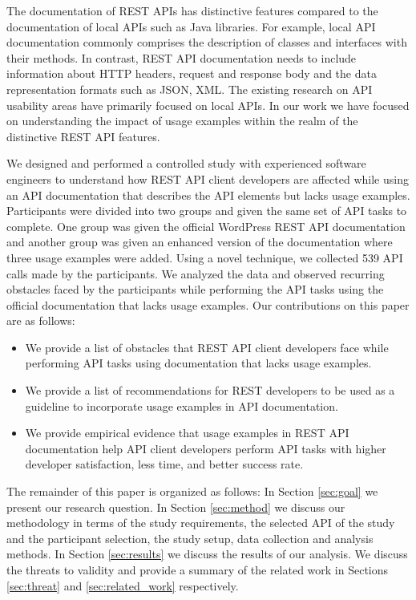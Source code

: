 The documentation of REST APIs has distinctive features compared to the documentation of local APIs such as Java libraries. For example, local API documentation commonly comprises the description of classes and interfaces with their methods. In contrast, REST API documentation needs to include information about HTTP headers, request and response body and the data representation formats such as JSON, XML. The existing research on API usability areas have primarily focused on local APIs. In our work we have focused on understanding the impact of usage examples within the realm of the distinctive REST API features.

We designed and performed a controlled study with experienced software engineers to understand how REST API client developers are affected while using an API documentation that describes the API elements but lacks usage examples. Participants were divided into two groups and given the same set of API tasks to complete. One group was given the official WordPress REST API documentation and another group was given an enhanced version of the documentation where three usage examples were added. Using a novel technique, we collected 539 API calls made by the participants. We analyzed the data and observed recurring obstacles faced by the participants while performing the API tasks using the official documentation that lacks usage examples. Our contributions on this paper are as follows:

\begin{itemize}
  \item We provide a list of obstacles that REST API client developers face while performing API tasks using documentation that lacks usage examples.
  \item We provide a list of recommendations for REST developers to be used as a guideline to incorporate usage examples in API documentation.
  \item We provide empirical evidence that usage examples in REST API documentation help API client developers perform API tasks with higher developer satisfaction, less time, and better success rate.
\end{itemize}

The remainder of this paper is organized as follows: In Section \ref{sec:goal} we present our research question. In Section \ref{sec:method} we discuss our methodology in terms of the study requirements, the selected API of the study and the participant selection, the study setup, data collection and analysis methods. In Section \ref{sec:results} we discuss the results of our analysis. We discuss the threats to validity and provide a summary of the related work in Sections \ref{sec:threat} and  \ref{sec:related_work} respectively.

